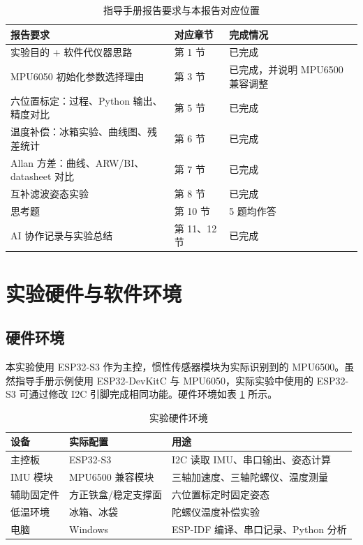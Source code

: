 \documentclass[UTF8,a4paper,12pt]{ctexart}
\begin{document}
\begin{table}[H]
\centering
\caption{指导手册报告要求与本报告对应位置}
\begin{tabular}{p{}p{}p{}}
\toprule
报告要求 & 对应章节 & 完成情况\\
\midrule
实验目的 + 软件代仪器思路 & 第 1 节 & 已完成\\
MPU6050 初始化参数选择理由 & 第 3 节 & 已完成，并说明 MPU6500 兼容调整\\
六位置标定：过程、Python 输出、精度对比 & 第 5 节 & 已完成\\
温度补偿：冰箱实验、曲线图、残差统计 & 第 6 节 & 已完成\\
Allan 方差：曲线、ARW/BI、datasheet 对比 & 第 7 节 & 已完成\\
互补滤波姿态实验 & 第 8 节 & 已完成\\
思考题 & 第 10 节 & 5 题均作答\\
AI 协作记录与实验总结 & 第 11、12 节 & 已完成\\
\bottomrule
\end{tabular}
\end{table}

\section{实验硬件与软件环境}
\subsection{硬件环境}
本实验使用 ESP32-S3 作为主控，惯性传感器模块为实际识别到的 MPU6500。虽然指导手册示例使用 ESP32-DevKitC 与 MPU6050，实际实验中使用的 ESP32-S3 可通过修改 I2C 引脚完成相同功能。硬件环境如表 \ref{tab:hardware} 所示。

\begin{table}[H]
\centering
\caption{实验硬件环境}
\label{tab:hardware}
\begin{tabular}{lll}
\toprule
设备 & 实际配置 & 用途\\
\midrule
主控板 & ESP32-S3 & I2C 读取 IMU、串口输出、姿态计算\\
IMU 模块 & MPU6500 兼容模块 & 三轴加速度、三轴陀螺仪、温度测量\\
辅助固定件 & 方正铁盒/稳定支撑面 & 六位置标定时固定姿态\\
低温环境 & 冰箱、冰袋 & 陀螺仪温度补偿实验\\
电脑 & Windows & ESP-IDF 编译、串口记录、Python 分析\\
\bottomrule
\end{tabular}
\end{table}
\end{document}
